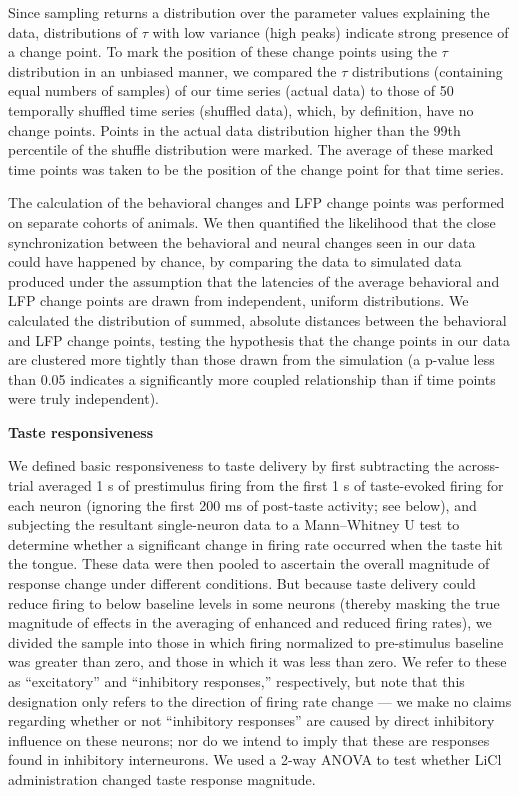 \begin{refsection}
Since sampling returns a distribution over the parameter values explaining the data, distributions of \(\tau\) with low variance (high peaks) indicate strong presence of a change point. To mark the position of these change points using the \(\tau\) distribution in an unbiased manner, we compared the \(\tau\) distributions (containing equal numbers of samples) of our time series (actual data) to those of 50 temporally shuffled time series (shuffled data), which, by definition, have no change points. Points in the actual data distribution higher than the 99th percentile of the shuffle distribution were marked. The average of these marked time points was taken to be the position of the change point for that time series.

The calculation of the behavioral changes and LFP change points was performed on separate cohorts of animals. We then quantified the likelihood that the close synchronization between the behavioral and neural changes seen in our data could have happened by chance, by comparing the data to simulated data produced under the assumption that the latencies of the average behavioral and LFP change points are drawn from independent, uniform distributions. We calculated the distribution of summed, absolute distances between the behavioral and LFP change points, testing the hypothesis that the change points in our data are clustered more tightly than those drawn from the simulation (a p-value less than 0.05 indicates a significantly more coupled relationship than if time points were truly independent).

\smallskip
\noindent\textbf{Taste responsiveness}\par
\noindent 
We defined basic responsiveness to taste delivery by first subtracting the across-trial averaged 1 s of prestimulus firing from the first 1 s of taste-evoked firing for each neuron (ignoring the first 200 ms of post-taste activity; see below), and subjecting the resultant single-neuron data to a Mann–Whitney U test to determine whether a significant change in firing rate occurred when the taste hit the tongue. These data were then pooled to ascertain the overall magnitude of response change under different conditions. But because taste delivery could reduce firing to below baseline levels in some neurons (thereby masking the true magnitude of effects in the averaging of enhanced and reduced firing rates), we divided the sample into those in which firing normalized to pre-stimulus baseline was greater than zero, and those in which it was less than zero. We refer to these as “excitatory” and “inhibitory responses,” respectively, but note that this designation only refers to the direction of firing rate change --- we make no claims regarding whether or not “inhibitory responses” are caused by direct inhibitory influence on these neurons; nor do we intend to imply that these are responses found in inhibitory interneurons. We used a 2-way ANOVA to test whether LiCl administration changed taste response magnitude.


\end{refsection}
